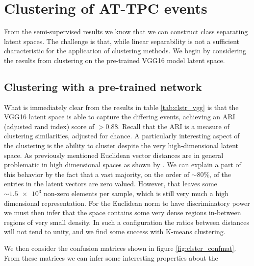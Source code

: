 \section{Clustering of AT-TPC events}

From the semi-supervised results we know that we can construct class separating latent spaces. The challenge is that, while linear separability is not a sufficient characteristic for the application of clustering methods. We begin by considering the results from clustering on the pre-trained VGG16 model latent space. 

\subsection{Clustering with a pre-trained network}

What is immediately clear from the results in table \ref{tab:clstr_vgg} is that the VGG16 latent space is able to capture the differing events, achieving an ARI (adjusted rand index) score of $>0.88$. Recall that the ARI is a measure of clustering similarities, adjusted for chance. A particularly interesting aspect of the clustering is the ability to cluster despite the very high-dimensional latent space. As previously mentioned Euclidean vector distances are in general problematic in high dimensional spaces as shown by \cite{Aggarwal}. We can explain a part of this behavior by the fact that a vast majority, on the order of $\sim 80\%$, of the entries in the latent vectors are zero valued. However, that leaves some $\sim \num{1.5e3}$ non-zero elements per sample, which is still very much a high dimensional representation. For the Euclidean norm to have discriminatory power we must then infer that the space contains some very dense regions in-between regions of very small density. In such a configuration the ratios between distances will not tend to unity, and we find some success with K-means clustering.

We then consider the confusion matrices shown in figure \ref{fig:clster_confmat}. From these matrices we can infer some interesting properties about the  